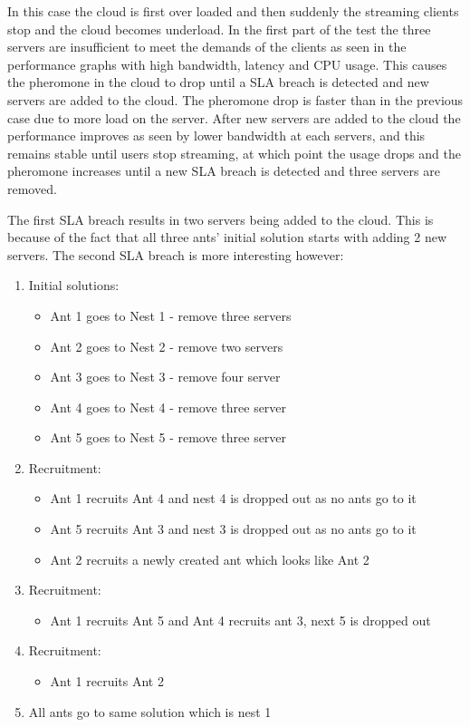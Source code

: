 In this case the cloud is first over loaded and then suddenly the streaming clients stop and the cloud becomes underload. In the first part of the test the three servers are insufficient to meet the demands of the clients as seen in the performance graphs with high bandwidth, latency and CPU usage. This causes the pheromone in the cloud to drop until a SLA breach is detected and new servers are added to the cloud. The pheromone drop is faster than in the previous case due to more load on the server. After new servers are added to the cloud the performance improves as seen by lower bandwidth at each servers, and this remains stable until users stop streaming, at which point the usage drops and the pheromone increases until a new SLA breach is detected and three servers are removed.

The first SLA breach results in two servers being added to the cloud. This is because of the fact that all three ants' initial solution starts with adding 2 new servers. The second SLA breach is more interesting however:

\begin{enumerate}
	\item Initial solutions: 
	\begin{itemize}
		\item Ant 1 goes to Nest 1 - remove three servers
		\item Ant 2 goes to Nest 2 - remove two servers
		\item Ant 3 goes to Nest 3 - remove four server
		\item Ant 4 goes to Nest 4 - remove three server
		\item Ant 5 goes to Nest 5 - remove three server
	\end{itemize}
	\item Recruitment:
	\begin{itemize}
		\item Ant 1 recruits Ant 4 and nest 4 is dropped out as no ants go to it
		\item Ant 5 recruits Ant 3 and nest 3 is dropped out as no ants go to it
		\item Ant 2 recruits a newly created ant which looks like Ant 2
	\end{itemize}
	\item Recruitment:
	\begin{itemize}
		\item Ant 1 recruits Ant 5 and Ant 4 recruits ant 3, next 5 is dropped out
	\end{itemize}
	\item Recruitment:
	\begin{itemize}
		\item Ant 1 recruits Ant 2
	\end{itemize}
	\item All ants go to same solution which is nest 1
\end{enumerate}


